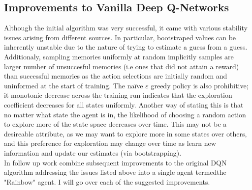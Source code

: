 \subsection{Improvements to Vanilla Deep Q-Networks}
Although the initial algorithm was very successful, it came with various stability 
issues arising from different sources. In particular, bootstraped values can be inherently
unstable \cite{sutton2018reinforcement} due to the nature of trying to estimate a guess from
a guess. Additionaly, sampling memories uniformly at random implicitly samples
are larger number of unsuccesful memories (i.e ones that did not attain a reward) than successful
memories as the action selections are initially random and uninformed at the start of training.
The na\"{i}ve $\varepsilon$ greedy policy is also prohibitive; it monotonic decrease across
the training run indicates that the exploration coefficient decreases for all states uniformly.
Another way of stating this is that no matter what state the agent is in, the likelihood
of choosing a random action to explore more of the state space decreases over time.
This may not be a desireable attribute, as we may want to explore more in some states over others,
and this preference for exploration may change over time as learn new information and update
our estimates (via bootstrapping). \\
In follow up work \cite{Hessel2017} combine subsequent improvements to the original DQN algorithm
addressing the issues listed above into a single agent termedthe "Rainbow" agent. I will
go over each of the suggested improvements.
